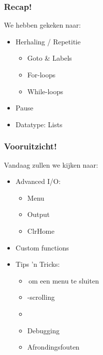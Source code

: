 
\begin{frame}
\frametitle{Recap!}


We hebben gekeken naar:
\begin{itemize}
	\item<2-> Herhaling / Repetitie
		\begin{itemize}
		  \item<3-> Goto \& Labels
		  \item<4-> For-loops
		  \item<5-> While-loops
		\end{itemize}
	\item<6-> Pause
	\item<7-> Datatype: Lists
\end{itemize}
\end{frame}

\begin{frame}
\frametitle{Vooruitzicht!}

Vandaag zullen we kijken naar:
\begin{itemize}
	\item<2-> Advanced I/O:
		\begin{itemize}
		  \item<3-> Menu
		  \item<4-> Output
		  \item<5-> ClrHome
		\end{itemize}
	\item<6-> Custom functions
	\item<7-> Tips 'n Tricks:
		\begin{itemize}
		  \item<8-> \tiCLEAR\,om een menu te sluiten
		  \item<9-> \tiALPHA-scrolling
		  \item<10-> \tiCATALOG
		  \item<11-> Debugging
		  \item<12-> Afrondingsfouten
		\end{itemize}
\end{itemize}

\end{frame}


